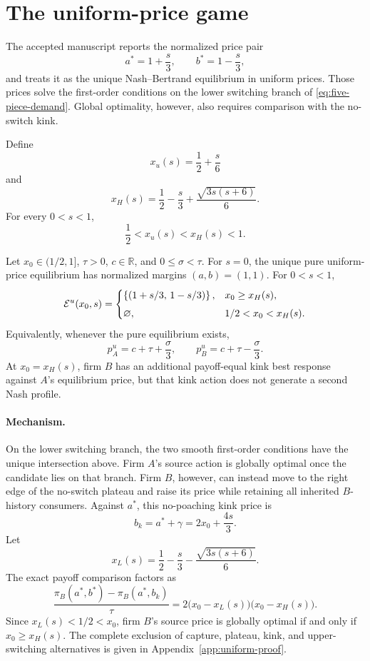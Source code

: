 \section{The uniform-price game}
\label{sec:uniform}

The accepted manuscript reports the normalized price pair
\[
a^*=1+\frac{s}{3},
\qquad
b^*=1-\frac{s}{3},
\]
and treats it as the unique Nash--Bertrand equilibrium in uniform prices. Those prices solve the first-order conditions on the lower switching branch of \eqref{eq:five-piece-demand}. Global optimality, however, also requires comparison with the no-switch kink.

Define
\[
x_u(s)=\frac12+\frac{s}{6}
\]
and
\begin{equation}
x_H(s)
=
\frac12-\frac{s}{3}
+\frac{\sqrt{3s(s+6)}}{6}.
\label{eq:xH}
\end{equation}
For every \(0<s<1\),
\[
\frac12<x_u(s)<x_H(s)<1.
\]

\begin{proposition}
\label{prop:uniform}
Let \(x_0\in(1/2,1]\), \(\tau>0\), \(c\in\mathbb R\), and \(0\le\sigma<\tau\). For \(s=0\), the unique pure uniform-price equilibrium has normalized margins \((a,b)=(1,1)\). For \(0<s<1\),
\[
\mathcal E^u(x_0,s)
=
\begin{cases}
\left\{\left(1+s/3,\,1-s/3\right)\right\},
&x_0\ge x_H(s),\\[0.4em]
\varnothing,
&1/2<x_0<x_H(s).
\end{cases}
\]
Equivalently, whenever the pure equilibrium exists,
\[
p_A^u=c+\tau+\frac{\sigma}{3},
\qquad
p_B^u=c+\tau-\frac{\sigma}{3}.
\]
At \(x_0=x_H(s)\), firm \(B\) has an additional payoff-equal kink best response against \(A\)'s equilibrium price, but that kink action does not generate a second Nash profile.
\end{proposition}

\paragraph{Mechanism.}
On the lower switching branch, the two smooth first-order conditions have the unique intersection above. Firm \(A\)'s source action is globally optimal once the candidate lies on that branch. Firm \(B\), however, can instead move to the right edge of the no-switch plateau and raise its price while retaining all inherited \(B\)-history consumers. Against \(a^*\), this no-poaching kink price is
\[
b_k=a^*+\gamma=2x_0+\frac{4s}{3}.
\]
Let
\[
x_L(s)=
\frac12-\frac{s}{3}
-\frac{\sqrt{3s(s+6)}}{6}.
\]
The exact payoff comparison factors as
\begin{equation}
\frac{\pi_B(a^*,b^*)-\pi_B(a^*,b_k)}{\tau}
=
2\bigl(x_0-x_L(s)\bigr)\bigl(x_0-x_H(s)\bigr).
\label{eq:kink-factor}
\end{equation}
Since \(x_L(s)<1/2<x_0\), firm \(B\)'s source price is globally optimal if and only if \(x_0\ge x_H(s)\). The complete exclusion of capture, plateau, kink, and upper-switching alternatives is given in Appendix~\ref{app:uniform-proof}.

